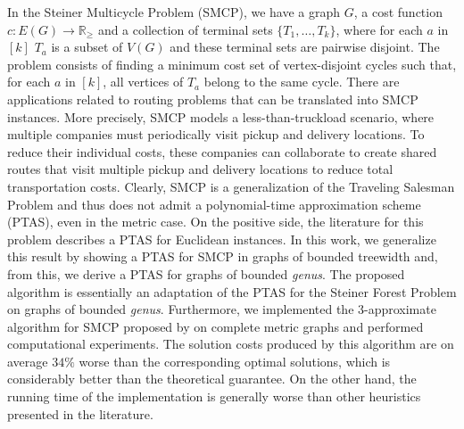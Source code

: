 
In the Steiner Multicycle Problem (SMCP), we have a graph \(G\), a cost function $c \colon E(G) \to \mathbb{R}_\ge$ and a collection of terminal sets \(\{T_1, \dots , T_k\}\), where for each \(a\) in \([k]\) \(T_a\) is a subset of \(V(G)\) and these terminal sets are pairwise disjoint. The problem consists of finding a minimum cost set of vertex-disjoint cycles such that, for each \(a\) in \([k]\), all vertices of \(T_a\) belong to the same cycle.
There are applications related to routing problems that can be translated into SMCP instances.
More precisely, SMCP models a less-than-truckload scenario, where multiple companies must periodically visit pickup and delivery locations.
To reduce their individual costs, these companies can collaborate to create shared routes that visit multiple pickup and delivery locations to reduce total transportation costs.
Clearly, SMCP is a generalization of the Traveling Salesman Problem and thus does not admit a polynomial-time approximation scheme (PTAS), even in the metric case.
On the positive side, the literature for this problem describes a PTAS for Euclidean instances. In this work, we generalize this result by showing a PTAS for SMCP in graphs of bounded treewidth and, from this, we derive a PTAS for graphs of bounded \textit{genus}.
The proposed algorithm is essentially an adaptation of the PTAS for the Steiner Forest Problem on graphs of bounded \textit{genus}.
Furthermore, we implemented the 3-approximate algorithm for SMCP proposed by \cite{smcp_3apx} on complete metric graphs and performed computational experiments.
The solution costs produced by this algorithm are on average \(34\%\) worse than the corresponding optimal solutions, which is considerably better than the theoretical guarantee.
On the other hand, the running time of the implementation is generally worse than other heuristics presented in the literature.
\hfill\\

